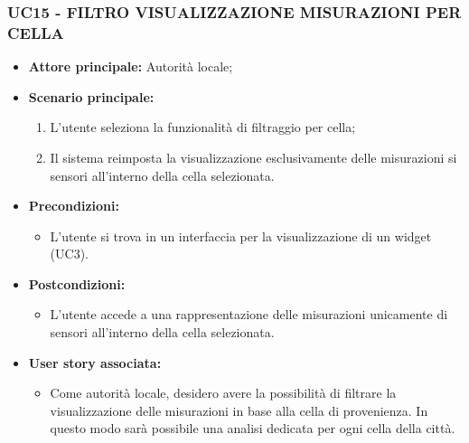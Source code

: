 \subsubsection{UC15 - FILTRO VISUALIZZAZIONE MISURAZIONI PER CELLA}
\begin{itemize}
    \item \textbf{Attore principale:} Autorità locale;
    \item \textbf{Scenario principale:}
          \begin{enumerate}
              \item L'utente seleziona la funzionalità di filtraggio per cella;
              \item Il sistema reimposta la visualizzazione esclusivamente delle misurazioni si sensori all'interno della cella selezionata.
          \end{enumerate}
    \item \textbf{Precondizioni:}
          \begin{itemize}
              \item  L'utente si trova in un interfaccia per la visualizzazione di un widget (UC3).
          \end{itemize}
    \item \textbf{Postcondizioni:}
          \begin{itemize}
              \item  L'utente accede a una rappresentazione delle misurazioni unicamente di sensori all'interno della cella selezionata.
          \end{itemize}
    \item \textbf{User story associata:}
          \begin{itemize}
            \item Come autorità locale, desidero avere la possibilità di filtrare la visualizzazione delle misurazioni in base alla cella di provenienza. In questo modo sarà possibile una analisi dedicata per ogni cella della città.
          \end{itemize}
\end{itemize}
